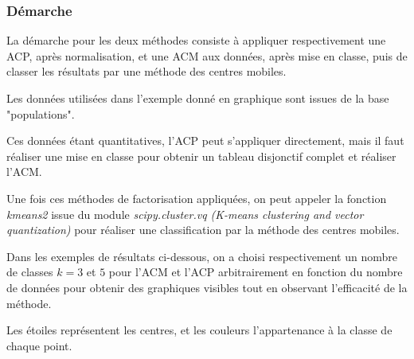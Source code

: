 
\subsubsection{Démarche}

La démarche pour les deux méthodes consiste à appliquer respectivement une ACP, après normalisation, et une ACM aux données, après mise en classe, puis de classer les résultats par une méthode des centres mobiles.

Les données utilisées dans l'exemple donné en graphique sont issues de la base "populations".

Ces données étant quantitatives, l'ACP peut s'appliquer directement, mais il faut réaliser une mise en classe pour obtenir un tableau disjonctif complet et réaliser l'ACM.

Une fois ces méthodes de factorisation appliquées, on peut appeler la fonction \textit{kmeans2} issue du module \textit{scipy.cluster.vq (K-means clustering and vector quantization)} pour réaliser une classification par la méthode des centres mobiles.

Dans les exemples de résultats ci-dessous, on a choisi respectivement un nombre de classes $k = 3$ et $5$ pour l'ACM et l'ACP arbitrairement en fonction du nombre de données pour obtenir des graphiques visibles tout en observant l'efficacité de la méthode.

Les étoiles représentent les centres, et les couleurs l'appartenance à la classe de chaque point.

